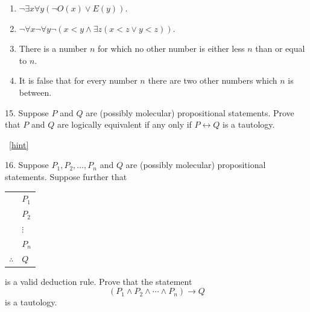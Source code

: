 \documentclass[10pt,]{book}
\theoremstyle{plain}
\theoremstyle{definition}
\theoremstyle{definition}
\theoremstyle{definition}
\numberwithin{equation}{chapter}
\newcommand{\hrulethin}  {\noalign{\hrule height 0.04em}}
\def\iff{\leftrightarrow}
\def\imp{\rightarrow}
\newcommand{\lt}{<}
\begin{document}
\begin{exerciselist}
\begin{enumerate}[label=(\alph*)]
\item\hypertarget{li-496}{}\(\neg \exists x \forall y (\neg O(x) \vee E(y))\).%
\item\hypertarget{li-497}{}\(\neg \forall x \neg \forall y \neg(x \lt  y \wedge \exists z (x \lt  z \vee y \lt  z))\).%
\item\hypertarget{li-498}{}\hypertarget{p-2467}{}%
There is a number \(n\) for which no other number is either less \(n\) than or equal to \(n\).%
\item\hypertarget{li-499}{}\hypertarget{p-2468}{}%
It is false that for every number \(n\) there are two other numbers which \(n\) is between.%
\end{enumerate}
%
\par\smallskip
\item[15.]\hypertarget{exercise-113}{}\hypertarget{p-2472}{}%
Suppose \(P\) and \(Q\) are (possibly molecular) propositional statements.  Prove that \(P\) and \(Q\) are logically equivalent if any only if \(P \iff Q\) is a tautology.%
\par\smallskip
~\hfill{\tiny\hyperlink{a-B.4.15}{[hint]}\hypertarget{q-B.4.15}{}}\item[16.]\hypertarget{exercise-114}{}\hypertarget{p-2474}{}%
Suppose \(P_1, P_2, \ldots, P_n\) and \(Q\) are (possibly molecular) propositional statements.  Suppose further that%
\begin{sidebyside}{1}{0}{0}{0}
\begin{sbspanel}{1}
{\centering%
\begin{tabular}{ll}
&\(P_1\)\tabularnewline[0pt]
&\(P_2\)\tabularnewline[0pt]
&\(\vdots\)\tabularnewline[0pt]
&\(P_n\)\tabularnewline\hrulethin
\(\therefore\)&\(Q\)
\end{tabular}
\par}
\end{sbspanel}
\end{sidebyside}
\par
\hypertarget{p-2475}{}%
is a valid deduction rule.  Prove that the statement%
\begin{equation*}
(P_1 \wedge P_2 \wedge \cdots \wedge P_n) \imp Q
\end{equation*}
is a tautology.%
\par\smallskip
\end{exerciselist}
\typeout{************************************************}
\typeout{************************************************}
\end{document}
